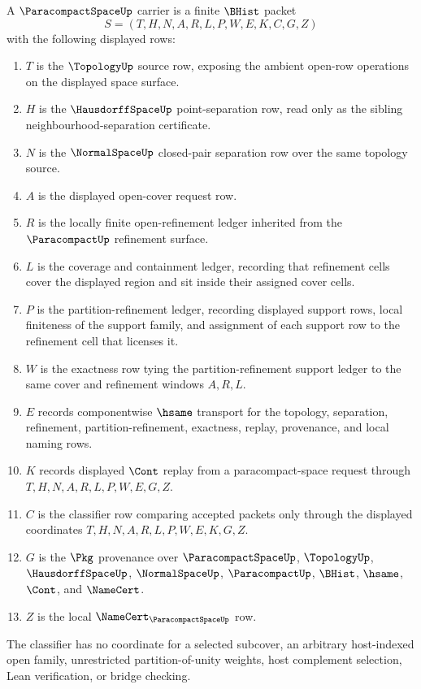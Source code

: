 \begin{definition}
\label{def:paracompact-space-carrier}
A $\ParacompactSpaceUp$ carrier is a finite $\BHist$ packet
$$
S=(T,H,N,A,R,L,P,W,E,K,C,G,Z)
$$
with the following displayed rows:
\begin{enumerate}
\item $T$ is the $\TopologyUp$ source row, exposing the ambient open-row operations on the displayed space surface.
\item $H$ is the $\HausdorffSpaceUp$ point-separation row, read only as the sibling neighbourhood-separation certificate.
\item $N$ is the $\NormalSpaceUp$ closed-pair separation row over the same topology source.
\item $A$ is the displayed open-cover request row.
\item $R$ is the locally finite open-refinement ledger inherited from the $\ParacompactUp$ refinement surface.
\item $L$ is the coverage and containment ledger, recording that refinement cells cover the displayed region and sit inside their assigned cover cells.
\item $P$ is the partition-refinement ledger, recording displayed support rows, local finiteness of the support family, and assignment of each support row to the refinement cell that licenses it.
\item $W$ is the exactness row tying the partition-refinement support ledger to the same cover and refinement windows $A,R,L$.
\item $E$ records componentwise $\hsame$ transport for the topology, separation, refinement, partition-refinement, exactness, replay, provenance, and local naming rows.
\item $K$ records displayed $\Cont$ replay from a paracompact-space request through $T,H,N,A,R,L,P,W,E,G,Z$.
\item $C$ is the classifier row comparing accepted packets only through the displayed coordinates $T,H,N,A,R,L,P,W,E,K,G,Z$.
\item $G$ is the $\Pkg$ provenance over $\ParacompactSpaceUp$, $\TopologyUp$, $\HausdorffSpaceUp$, $\NormalSpaceUp$, $\ParacompactUp$, $\BHist$, $\hsame$, $\Cont$, and $\NameCert$.
\item $Z$ is the local $\NameCert_{\ParacompactSpaceUp}$ row.
\end{enumerate}
The classifier has no coordinate for a selected subcover, an arbitrary host-indexed open family, unrestricted partition-of-unity weights, host complement selection, Lean verification, or bridge checking.
\end{definition}

